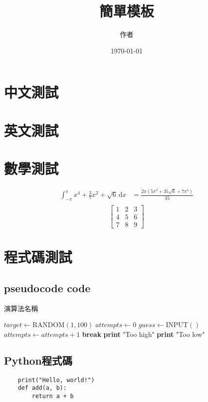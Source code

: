 \documentclass[12pt]{article}
\title{簡單模板}
\author{作者}
\date{\today}
\begin{document}
\maketitle

\section{中文測試}
\zhlipsum[1]
\section{英文測試}
\lipsum[1]
\section{數學測試}
\begin{align}
	\int_{-\pi }^{\pi } x^{4} + \frac{3}{7}x^2 + \sqrt{6}   \,\mathrm{d}x & = \frac{2 \pi (5 \pi^{2} + 35 \sqrt{6} + 7 \pi^{4})}{35} \\
\end{align}
\[
	\begin{bmatrix}
		1 & 2 & 3 \\
		4 & 5 & 6 \\
		7 & 8 & 9
	\end{bmatrix}
\]

\section{程式碼測試}
\subsection{pseudocode code}
\begin{algorithm}
	\caption{演算法名稱}\label{alg:guessnumber}
	\begin{algorithmic}[1]
		\State \(target \gets \text{RANDOM}(1, 100) \)
		\State \(attempts \gets 0\)
		\State \(guess \gets \text{INPUT}() \)
		\State \(attempts \gets attempts + 1\)
		\State \textbf{break}
		\State \textbf{print} "Too high"
		\Else
		\State \textbf{print} "Too low"
		\EndIf
		\EndWhile
	\end{algorithmic}
\end{algorithm}

\subsection{Python程式碼}
\begin{verbatim}
    print("Hello, world!")
    def add(a, b):
        return a + b
\end{verbatim}
\end{document}
